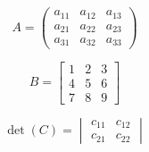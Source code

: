 
\begin{equation}
A = \begin{pmatrix}
a_{11} & a_{12} & a_{13} \\
a_{21} & a_{22} & a_{23} \\
a_{31} & a_{32} & a_{33}
\end{pmatrix}
\end{equation}

\begin{equation}
B = \begin{bmatrix}
1 & 2 & 3 \\
4 & 5 & 6 \\
7 & 8 & 9
\end{bmatrix}
\end{equation}

\begin{equation}
\det(C) = \begin{vmatrix}
c_{11} & c_{12} \\
c_{21} & c_{22}
\end{vmatrix}
\end{equation}







